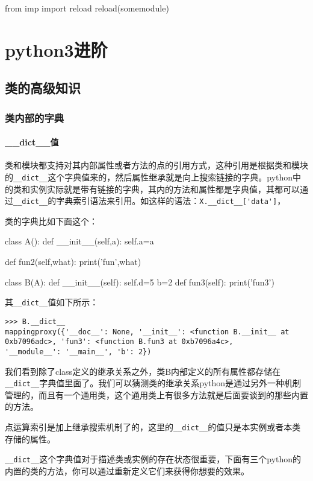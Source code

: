 \documentclass[12pt,oneside]{book}
\begin{document}
\begin{common-format}
\begin{tcbpython}[]
from imp import reload
reload(somemodule)
\end{tcbpython}





\part{python3进阶}
\chapter{类的高级知识}
\label{sec:类的高级知识}
\section{类内部的字典}
\subsection{\_{}\_{}dict\_{}\_{}值}
类和模块都支持对其内部属性或者方法的点的引用方式，这种引用是根据类和模块的\verb+__dict__+这个字典值来的，然后属性继承就是向上搜索链接的字典。python中的类和实例实际就是带有链接的字典，其内的方法和属性都是字典值，其都可以通过\verb+__dict__+的字典索引语法来引用。如这样的语法：\verb+X.__dict__['data']+，

类的字典比如下面这个：
\begin{tcbpython}[]
class A():
    def __init__(self,a):
        self.a=a

    def fun2(self,what):
        print('fun',what)

class B(A):
    def __init__(self):
        self.d=5
    b=2
    def fun3(self):
        print('fun3')
\end{tcbpython}
其\verb+__dict__+值如下所示：
\begin{Verbatim}
>>> B.__dict__
mappingproxy({'__doc__': None, '__init__': <function B.__init__ at 
0xb7096adc>, 'fun3': <function B.fun3 at 0xb7096a4c>, 
'__module__': '__main__', 'b': 2})
\end{Verbatim}

我们看到除了class定义的继承关系之外，类B内部定义的所有属性都存储在\verb+__dict__+字典值里面了。我们可以猜测类的继承关系python是通过另外一种机制管理的，而且有一个通用类，这个通用类上有很多方法就是后面要谈到的那些内置的方法。

点运算索引是加上继承搜索机制了的，这里的\verb+__dict__+的值只是本实例或者本类存储的属性。

\verb+__dict__+这个字典值对于描述类或实例的存在状态很重要，下面有三个python的内置的类的方法，你可以通过重新定义它们来获得你想要的效果。


\end{common-format}
\end{document}
